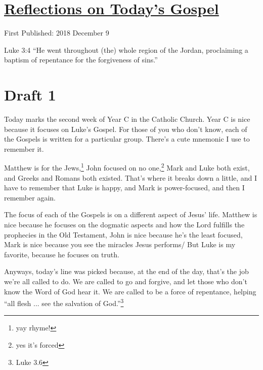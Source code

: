 \documentclass[12pt]{article}[titlepage]
\newcommand{\say}[1]{``#1''}
\newcommand{\1}{\={a}}
\newcommand{\2}{\={e}}
\newcommand{\3}{\={\i}}
\newcommand{\4}{\=o}
\newcommand{\5}{\=u}
\newcommand{\6}{\={A}}
\renewcommand{\,}{\textsuperscript{,}}
\begin{document}
\doublespacing
\section{\href{reflections-on-readings-2-advent-c.html}{Reflections on Today's Gospel}}
First Published: 2018 December 9

Luke 3:4 \say{He went throughout (the) whole region of the Jordan, proclaiming a baptism of repentance for the forgiveness of sins.}

\section{Draft 1}
Today marks the second week of Year C in the Catholic Church.
Year C is nice because it focuses on Luke's Gospel.
For those of you who don't know, each of the Gospels is written for a particular group.
There's a cute mnemonic I use to remember it.

Matthew is for the Jews,\footnote{yay rhyme!}
John focused on no one,\footnote{yes it's forced}
Mark and Luke both exist, and Greeks and Romans both existed.
That's where it breaks down a little, and I have to remember that Luke is happy, and Mark is power-focused, and then I remember again.

The focus of each of the Gospels is on a different aspect of Jesus' life.
Matthew is nice because he focuses on the dogmatic aspects and how the Lord fulfills the prophecies in the Old Testament, John is nice because he's the least focused, Mark is nice because you see the miracles Jesus performs/
But Luke is my favorite, because he focuses on truth.

Anyways, today's line was picked because, at the end of the day, that's the job we're all called to do.
We are called to go and forgive, and let those who don't know the Word of God hear it.
We are called to be a force of repentance, helping \say{all flesh ... see the salvation of God.}\footnote{Luke 3.6}
\end{document}
